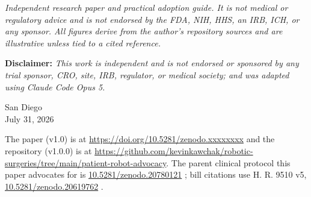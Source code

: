 \documentclass[11pt]{article}
\begin{document}
\parule{0.5pt}

\vspace{0.2em}

\noindent\footnotesize\textit{Independent research paper and practical adoption
guide. It is not medical or regulatory advice and is not endorsed by the FDA,
NIH, HHS, an IRB, ICH, or any sponsor. All figures derive from the author's
repository sources and are illustrative unless tied to a cited reference.}
\normalsize\par

\vspace{0.2em}

\noindent\footnotesize\textbf{Disclaimer:} \textit{This work is independent and
is not endorsed or sponsored by any trial sponsor, CRO, site, IRB, regulator, or
medical society; and was adapted using Claude Code Opus 5.}\normalsize\par

\vspace{0.3em}

\begin{center}\small
San Diego \\ July 31, 2026
\end{center}

\vspace{0.2em}

\noindent\footnotesize The paper (v1.0) is at
\href{https://doi.org/10.5281/zenodo.xxxxxxxx}{https://doi.org/10.5281/zenodo.xxxxxxxx}
and the repository (v1.0.0) is at
\href{https://github.com/kevinkawchak/robotic-surgeries/tree/main/patient-robot-advocacy}{https://github.com/kevinkawchak/robotic-surgeries/tree/main/patient-robot-advocacy}.
The parent clinical protocol this paper advocates for is
\href{https://doi.org/10.5281/zenodo.20780121}{10.5281/zenodo.20780121}
\cite{onpremwhippl}; bill citations use H. R. 9510 v5,
\href{https://doi.org/10.5281/zenodo.20619762}{10.5281/zenodo.20619762}
\cite{hr9510billv5}.\normalsize\par

\renewcommand{\keywordname}{\textbf{Keywords}}

\vspace{0.4em}
\parule{0.6pt}

\renewcommand{\contentsname}{\color{accentcol}Table of Contents}
{\setlength{\parskip}{0pt}\small\tableofcontents}
\end{document}

